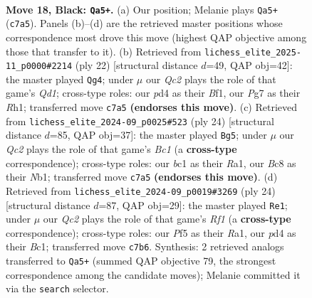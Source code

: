 \documentclass[11pt]{article}
\begin{document}
\clearpage

\begin{figure}[p]\centering
\begin{subfigure}{0.46\textwidth}\centering
\resizebox{\linewidth}{!}{%
\newchessgame
\chessboard[
  setfen={r1bk1b1r/ppq3pp/2p5/3p1p2/P2P4/1Q2PN1P/1P3PP1/1RB1K2R b K - 0 18},
  showmover=false,
  pgfstyle=straightmove, color=movearrow, markmove={c7-a5}
]}
\caption{}
\end{subfigure}\hfill
\begin{subfigure}{0.46\textwidth}\centering
\resizebox{\linewidth}{!}{%
\newchessgame
\chessboard[
  setfen={r1b1k1nr/1p1p1ppp/pq1Pp3/8/2Pp4/P2P4/1P3PPP/R1BQKB1R w KQkq - 1 12},
  showmover=false,
  pgfstyle=straightmove, color=movearrow, markmove={d1-g4}
]}
\caption{}
\end{subfigure}
\\[4pt]
\begin{subfigure}{0.46\textwidth}\centering
\resizebox{\linewidth}{!}{%
\newchessgame
\chessboard[
  setfen={r1b1k2r/2q2ppp/p1p2n2/1pb1pP2/4P3/3B3P/PPP1Q1P1/RNB2R1K w kq - 0 13},
  showmover=false,
  pgfstyle=straightmove, color=movearrow, markmove={c1-g5}
]}
\caption{}
\end{subfigure}\hfill
\begin{subfigure}{0.46\textwidth}\centering
\resizebox{\linewidth}{!}{%
\newchessgame
\chessboard[
  setfen={r1b1k2r/5ppp/p1p2n2/2p1q3/N2p4/3P4/PPP2PPP/R1BQ1RK1 w kq - 0 13},
  showmover=false,
  pgfstyle=straightmove, color=movearrow, markmove={f1-e1}
]}
\caption{}
\end{subfigure}
\caption{\textbf{Move 18, Black: \texttt{Qa5+}.} (a) Our position; Melanie plays \texttt{Qa5+} (\texttt{c7a5}). Panels (b)--(d) are the retrieved master positions whose correspondence most drove this move (highest QAP objective among those that transfer to it). (b) Retrieved from \texttt{lichess\_elite\_2025-11\_p0000\#2214} (ply 22) [structural distance $d$=49, QAP obj=42]: the master played \texttt{Qg4}; under $\mu$ our \emph{Qc2} plays the role of that game's \emph{Qd1}; cross-type roles: our \emph{p}d4 as their \emph{B}f1, our \emph{P}g7 as their \emph{R}h1; transferred move \texttt{c7a5} \textbf{(endorses this move)}. (c) Retrieved from \texttt{lichess\_elite\_2024-09\_p0025\#523} (ply 24) [structural distance $d$=85, QAP obj=37]: the master played \texttt{Bg5}; under $\mu$ our \emph{Qc2} plays the role of that game's \emph{Bc1} (a \textbf{cross-type} correspondence); cross-type roles: our \emph{b}c1 as their \emph{R}a1, our \emph{B}c8 as their \emph{N}b1; transferred move \texttt{c7a5} \textbf{(endorses this move)}. (d) Retrieved from \texttt{lichess\_elite\_2024-09\_p0019\#3269} (ply 24) [structural distance $d$=87, QAP obj=29]: the master played \texttt{Re1}; under $\mu$ our \emph{Qc2} plays the role of that game's \emph{Rf1} (a \textbf{cross-type} correspondence); cross-type roles: our \emph{P}f5 as their \emph{R}a1, our \emph{p}d4 as their \emph{B}c1; transferred move \texttt{c7b6}. Synthesis: 2 retrieved analogs transferred to \texttt{Qa5+} (summed QAP objective 79, the strongest correspondence among the candidate moves); Melanie committed it via the \texttt{search} selector.}
\label{fig:thought-m35}
\end{figure}
\end{document}
